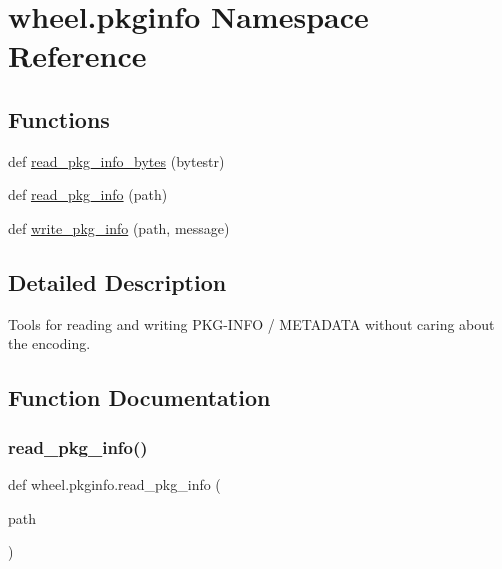 \hypertarget{namespacewheel_1_1pkginfo}{}\section{wheel.\+pkginfo Namespace Reference}
\label{namespacewheel_1_1pkginfo}
\subsection*{Functions}
\begin{DoxyCompactItemize}
\item 
def \hyperlink{namespacewheel_1_1pkginfo_ae2d9017b565a18ff8a4422461970ace6}{read\+\_\+pkg\+\_\+info\+\_\+bytes} (bytestr)
\item 
def \hyperlink{namespacewheel_1_1pkginfo_a2dd8c88042c310269ec861a2472ec930}{read\+\_\+pkg\+\_\+info} (path)
\item 
def \hyperlink{namespacewheel_1_1pkginfo_ae7528e51407875574b4938a7dc84bf20}{write\+\_\+pkg\+\_\+info} (path, message)
\end{DoxyCompactItemize}


\subsection{Detailed Description}
\begin{DoxyVerb}Tools for reading and writing PKG-INFO / METADATA without caring
about the encoding.\end{DoxyVerb}
 

\subsection{Function Documentation}
\mbox{\label{namespacewheel_1_1pkginfo_a2dd8c88042c310269ec861a2472ec930}} 
\subsubsection{\texorpdfstring{read\+\_\+pkg\+\_\+info()}{read\_pkg\_info()}}
{\footnotesize\ttfamily def wheel.\+pkginfo.\+read\+\_\+pkg\+\_\+info (\begin{DoxyParamCaption}\item[{}]{path }\end{DoxyParamCaption})}

